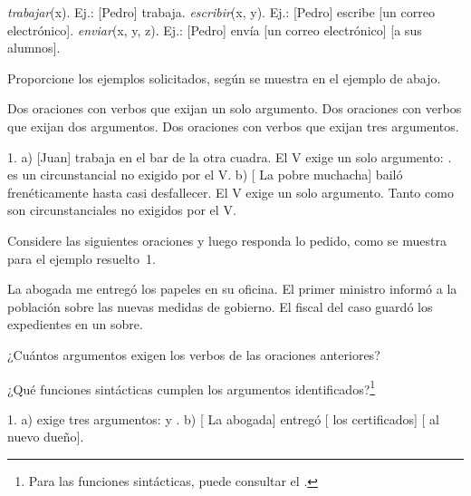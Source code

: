 \begin{exe}
  \ex\label{ex:06-trabajar} \textit{trabajar}(x). Ej.: [Pedro] trabaja.
  \ex\label{ex:06-escribir} \textit{escribir}(x, y). Ej.: [Pedro]
      escribe [un correo electrónico].
  \ex\label{ex:06-enviar} \textit{enviar}(x, y, z). Ej.: [Pedro] envía
      [un correo electrónico] [a sus alumnos].
\end{exe}

\begin{ejercicio}\label{ej:06-argumentos}
Proporcione los ejemplos solicitados, según se muestra en el ejemplo de abajo.

\begin{exe}
  \ex Dos oraciones con verbos que exijan un solo argumento.
  \ex Dos oraciones con verbos que exijan dos argumentos.
  \ex Dos oraciones con verbos que exijan tres argumentos.
\end{exe}

\begin{resuelto}
1. a) [Juan] trabaja en el bar de la otra cuadra. El V  exige un
solo argumento: .  es un
circunstancial no exigido por el V. b) [ La pobre muchacha] bailó
frenéticamente hasta casi desfallecer. El V  exige un solo
argumento. Tanto  como  son
circunstanciales no exigidos por el V.
\end{resuelto}
\end{ejercicio}

\begin{ejercicio}\label{ej:06-funciones}
Considere las siguientes oraciones y luego responda lo pedido, como se muestra
para el ejemplo resuelto~1.

\begin{exe}
  \ex La abogada me entregó los papeles en su oficina.
  \ex El primer ministro informó a la población sobre las nuevas medidas de
      gobierno.
  \ex El fiscal del caso guardó los expedientes en un sobre.
\end{exe}

\begin{consignas}
  \item ¿Cuántos argumentos exigen los verbos de las oraciones anteriores?
  \item ¿Qué funciones sintácticas cumplen los argumentos
        identificados?\footnote{Para las funciones sintácticas, puede consultar
        el .}
\end{consignas}

\begin{resuelto}
1. a)  exige tres argumentos:  y . b) [ La abogada] entregó
[ los certificados] [ al nuevo dueño].
\end{resuelto}
\end{ejercicio}


